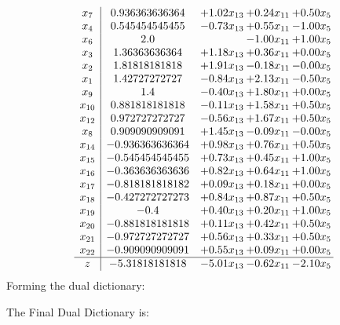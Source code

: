 \documentclass[8pt]{article}
\begin{document}
\[\begin{array}{c| c c@{\hskip 2pt} c@{\hskip 2pt} c@{\hskip 2pt} }
 x_{7}   &  0.936363636364 & +  1.02 x_{13} & +  0.24 x_{11} & +  0.50 x_{5}\\
 x_{4}   &  0.545454545455 & -0.73 x_{13} & +  0.55 x_{11} & -1.00 x_{5}\\
 x_{6}   &  2.0  &   & -1.00 x_{11} & +  1.00 x_{5}\\
 x_{3}   &  1.36363636364 & +  1.18 x_{13} & +  0.36 x_{11} & +  0.00 x_{5}\\
 x_{2}   &  1.81818181818 & +  1.91 x_{13} & -0.18 x_{11} & -0.00 x_{5}\\
 x_{1}   &  1.42727272727 & -0.84 x_{13} & +  2.13 x_{11} & -0.50 x_{5}\\
 x_{9}   &  1.4 & -0.40 x_{13} & +  1.80 x_{11} & +  0.00 x_{5}\\
 x_{10}   &  0.881818181818 & -0.11 x_{13} & +  1.58 x_{11} & +  0.50 x_{5}\\
 x_{12}   &  0.972727272727 & -0.56 x_{13} & +  1.67 x_{11} & +  0.50 x_{5}\\
 x_{8}   &  0.909090909091 & +  1.45 x_{13} & -0.09 x_{11} & -0.00 x_{5}\\
 x_{14}   &  -0.936363636364 & +  0.98 x_{13} & +  0.76 x_{11} & +  0.50 x_{5}\\
 x_{15}   &  -0.545454545455 & +  0.73 x_{13} & +  0.45 x_{11} & +  1.00 x_{5}\\
 x_{16}   &  -0.363636363636 & +  0.82 x_{13} & +  0.64 x_{11} & +  1.00 x_{5}\\
 x_{17}   &  -0.818181818182 & +  0.09 x_{13} & +  0.18 x_{11} & +  0.00 x_{5}\\
 x_{18}   &  -0.427272727273 & +  0.84 x_{13} & +  0.87 x_{11} & +  0.50 x_{5}\\
 x_{19}   &  -0.4 & +  0.40 x_{13} & +  0.20 x_{11} & +  1.00 x_{5}\\
 x_{20}   &  -0.881818181818 & +  0.11 x_{13} & +  0.42 x_{11} & +  0.50 x_{5}\\
 x_{21}   &  -0.972727272727 & +  0.56 x_{13} & +  0.33 x_{11} & +  0.50 x_{5}\\
 x_{22}   &  -0.909090909091 & +  0.55 x_{13} & +  0.09 x_{11} & +  0.00 x_{5}\\
\hline
z    &  -5.31818181818 & -5.01 x_{13} & -0.62 x_{11} & -2.10 x_{5}\\
\end{array}\]
Forming the dual dictionary:

The Final Dual Dictionary is: 
\end{document}
